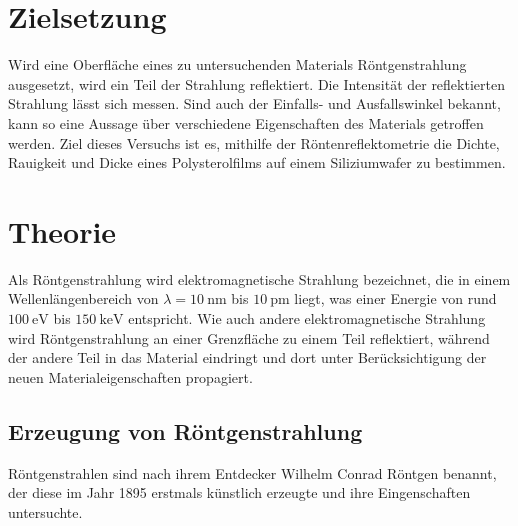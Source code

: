 \section{Zielsetzung}
\label{sec:Zielsetzung}
Wird eine Oberfläche eines zu untersuchenden Materials Röntgenstrahlung ausgesetzt, wird ein Teil der Strahlung reflektiert. Die Intensität der reflektierten 
Strahlung lässt sich messen. Sind auch der Einfalls- und Ausfallswinkel bekannt, kann so eine Aussage über verschiedene Eigenschaften des Materials getroffen werden.
Ziel dieses Versuchs ist es, mithilfe der Röntenreflektometrie die Dichte, Rauigkeit und Dicke eines Polysterolfilms auf einem Siliziumwafer zu bestimmen.

\section{Theorie}
\label{sec:Theorie}
Als Röntgenstrahlung wird elektromagnetische Strahlung bezeichnet, die in einem Wellenlängenbereich von $\lambda = \qty{10}{\nano\metre}$ bis $\qty{10}{\pico\metre}$
liegt, was einer Energie von rund $\qty{100}{\eV}$ bis $\qty{150}{\kilo\eV}$ entspricht. Wie auch andere elektromagnetische Strahlung wird Röntgenstrahlung 
an einer Grenzfläche zu einem Teil reflektiert, während der andere Teil in das Material eindringt und dort unter Berücksichtigung der neuen Materialeigenschaften
propagiert.

\subsection{Erzeugung von Röntgenstrahlung}
Röntgenstrahlen sind nach ihrem Entdecker Wilhelm Conrad Röntgen benannt, der diese im Jahr 1895 erstmals künstlich erzeugte und ihre Eingenschaften untersuchte.

